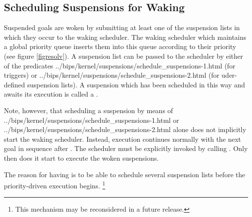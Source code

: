\subsection{Scheduling Suspensions for Waking}
\label{secwaking}%
Suspended goals are woken by submitting at least one of the suspension lists
in which they occur to the waking scheduler.
The waking scheduler which maintains a global priority queue inserts
them into this queue according to their priority (see figure \ref{figresolv}).
A suspension list can be passed to the scheduler by either of the predicates
%
{../bips/kernel/suspensions/schedule_suspensions-1.html}
(for triggers)
or
%
{../bips/kernel/suspensions/schedule_suspensions-2.html}
(for uder-defined suspension lists).
A suspension which has been scheduled in this way and awaits
its execution is called a
.

Note, however, that scheduling a suspension by means of
%
{../bips/kernel/suspensions/schedule_suspensions-1.html}
or
%
{../bips/kernel/suspensions/schedule_suspensions-2.html}
alone does not implicitly start the waking scheduler.
Instead, execution continues normally with the next goal in sequence after
.
The scheduler must be explicitly invoked by calling
.
Only then does it start to execute the woken suspensions.

The reason for having 
is to be able to schedule several suspension lists before the
priority-driven execution begins.%
\footnote{This mechanism may be reconsidered in a future release.}



